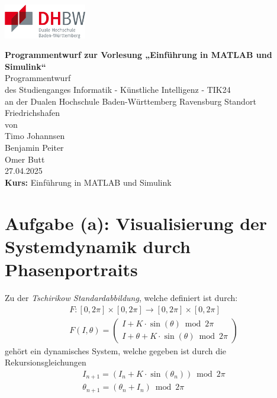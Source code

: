 \documentclass[paper=a4, 
                DIV=12]{scrartcl}
\newcommand{\thesisauthor}{Timo Johannsen \\ Benjamin Peiter \\ Omer Butt}
\newcommand{\thesiscourse}{Einführung in MATLAB und Simulink}
\newcommand{\thesisstudy}{Informatik - Künstliche Intelligenz - TIK24}
\newcommand{\thesistype}{Programmentwurf}
\newcommand{\thesistitle}{Programmentwurf zur Vorlesung „Einführung in MATLAB und Simulink“}
\newcommand{\thesisdate}{27.04.2025}
\begin{document}
\begingroup
    \begin{flushright} %
        \includegraphics[height=1.5cm]{figures/dhbw.png}
    \end{flushright} 
    \centering
    \vspace*{0.5cm}
    \Large
    \textbf{\thesistitle} \\
    \vspace*{3cm}
    \normalsize
    \thesistype \\
    \vspace*{2.5cm}
    des Studienganges \thesisstudy \\
    an der Dualen Hochschule Baden-Württemberg Ravensburg Standort Friedrichshafen\\
    \vspace*{2.5cm}
    von \\
    \thesisauthor \\
    \vfill
    \thesisdate\\
    \vspace*{1cm}
    \textbf{Kurs:} \thesiscourse\\
    \normalsize

\endgroup

\newpage
\tableofcontents
\newpage

\section{Aufgabe (a): Visualisierung der Systemdynamik durch Phasenportraits}
Zu der \textit{Tschirikow Standardabbildung}, welche definiert ist durch:
\begin{gather*}
    F: [0,2\pi] \times [0,2\pi] \to [0,2\pi] \times [0,2\pi] \\
    F(I, \theta) = 
    \begin{pmatrix}
        I + K \cdot \sin(\theta) \bmod 2\pi \\
        I + \theta + K \cdot \sin(\theta) \bmod 2\pi
    \end{pmatrix}
\end{gather*}
gehört ein dynamisches System, welche gegeben ist durch die Rekursionsgleichungen
\begin{gather*}
    I_{n+1} = (I_n + K \cdot \sin(\theta_n)) \bmod 2\pi \\
    \theta_{n+1} = (\theta_n + I_n) \bmod 2\pi
\end{gather*}
\end{document}
